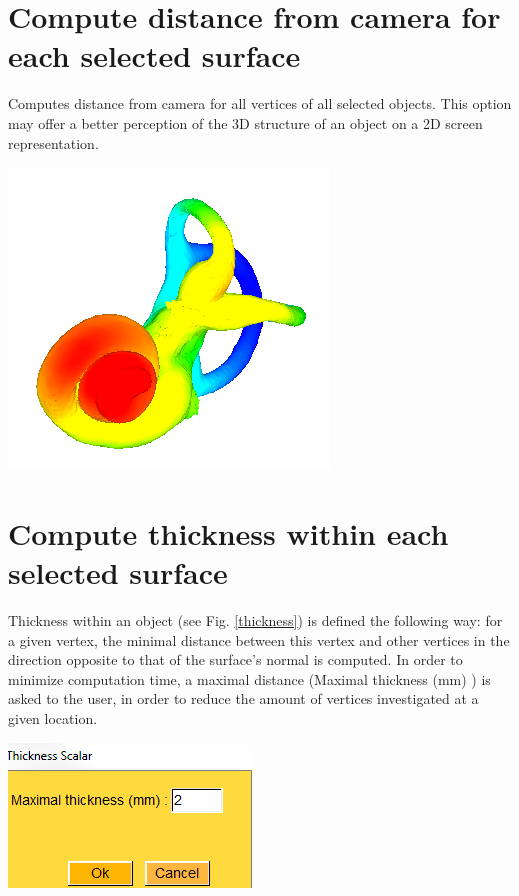 \section{Compute distance from camera for each selected surface}
\noindent
\begin{minipage}{0.5\textwidth}
Computes distance from camera for all vertices of
all selected objects. This option may offer a better
perception of the 3D structure of an object on a
2D screen representation.
\end{minipage}    
\begin{minipage}{0.5\textwidth}\centering
  \includegraphics[scale=0.5]{images/Scalars_renreding/Depth.png}
\label{depth_scalar}
 \end{minipage} 
\noindent

\section{Compute thickness within each selected surface}
\noindent
\begin{minipage}{0.5\textwidth}
Thickness within an object (see Fig. \ref{thickness}) is defined the following way: for a
given vertex, the minimal distance between this vertex and other
vertices in the direction opposite to that of the surface's normal
is computed. In order to minimize computation time, a maximal
distance (Maximal thickness (mm) ) is asked to the user, in order
to reduce the amount of vertices investigated at a given location.
\end{minipage}    
\begin{minipage}{0.5\textwidth}\centering
  \includegraphics[scale=0.5]{images/Scalars_renreding/Thickness_window.png}
\label{thickness_window}
 \end{minipage} 
\noindent



